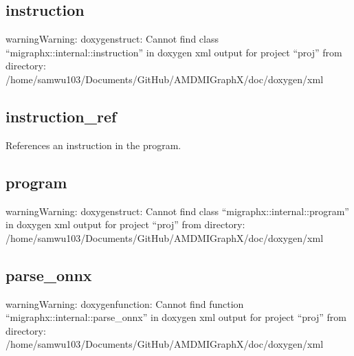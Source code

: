 \documentclass[letterpaper,10pt,english]{sphinxmanual}
\begin{document}
\subsection{instruction}
\label{\detokenize{dev/program:instruction}}
\begin{sphinxadmonition}{warning}{Warning:}
\sphinxAtStartPar
doxygenstruct: Cannot find class “migraphx::internal::instruction” in doxygen xml output for project “proj” from directory: /home/samwu103/Documents/GitHub/AMDMIGraphX/doc/doxygen/xml
\end{sphinxadmonition}


\subsection{instruction\_ref}
\label{\detokenize{dev/program:instruction-ref}}

\begin{fulllineitems}
\label{\detokenize{dev/program:_CPPv4N8migraphx8internal15instruction_refE}}%
\pysigstartmultiline
{}%
\pysigstopmultiline
\sphinxAtStartPar
References an instruction in the program.

\end{fulllineitems}



\subsection{program}
\label{\detokenize{dev/program:id1}}
\begin{sphinxadmonition}{warning}{Warning:}
\sphinxAtStartPar
doxygenstruct: Cannot find class “migraphx::internal::program” in doxygen xml output for project “proj” from directory: /home/samwu103/Documents/GitHub/AMDMIGraphX/doc/doxygen/xml
\end{sphinxadmonition}


\subsection{parse\_onnx}
\label{\detokenize{dev/program:parse-onnx}}
\begin{sphinxadmonition}{warning}{Warning:}
\sphinxAtStartPar
doxygenfunction: Cannot find function “migraphx::internal::parse\_onnx” in doxygen xml output for project “proj” from directory: /home/samwu103/Documents/GitHub/AMDMIGraphX/doc/doxygen/xml
\end{sphinxadmonition}
\end{document}
